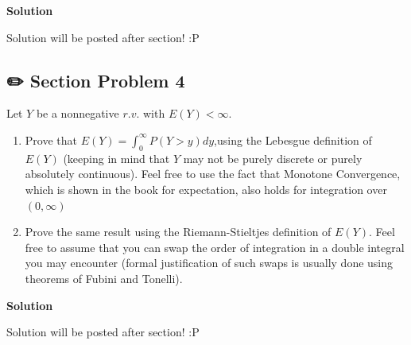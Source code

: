 \documentclass[
  letterpaper,
  DIV=11,
  numbers=noendperiod]{scrreprt}
\theoremstyle{plain}
\theoremstyle{definition}
\theoremstyle{remark}
\begin{document}
\begin{tcolorbox}[enhanced jigsaw, arc=.35mm, colframe=quarto-callout-tip-color-frame, left=2mm, rightrule=.15mm, bottomrule=.15mm, colback=white, toprule=.15mm, opacityback=0, leftrule=.75mm, breakable]
\begin{minipage}[t]{5.5mm}
\textcolor{quarto-callout-tip-color}{\faLightbulb}
\end{minipage}%
\begin{minipage}[t]{\textwidth - 5.5mm}

\textbf{Solution}\vspace{2mm}

Solution will be posted after section! :P

\end{minipage}%
\end{tcolorbox}

\hypertarget{section-problem-4-4}{%
\subsection*{✏️ Section Problem 4}\label{section-problem-4-4}}

Let \(Y\) be a nonnegative \(r.v.\) with \(E(Y)< \infty\).

\begin{enumerate}
\def\labelenumi{(\alph{enumi})}
\item
  Prove that \(E(Y) =\int_0^\infty P(Y > y)dy\),using the Lebesgue
  definition of \(E(Y)\) (keeping in mind that \(Y\) may not be purely
  discrete or purely absolutely continuous). Feel free to use the fact
  that Monotone Convergence, which is shown in the book for expectation,
  also holds for integration over \((0,\infty)\)
\item
  Prove the same result using the Riemann-Stieltjes definition of
  \(E(Y)\). Feel free to assume that you can swap the order of
  integration in a double integral you may encounter (formal
  justification of such swaps is usually done using theorems of Fubini
  and Tonelli).
\end{enumerate}

\begin{tcolorbox}[enhanced jigsaw, arc=.35mm, colframe=quarto-callout-tip-color-frame, left=2mm, rightrule=.15mm, bottomrule=.15mm, colback=white, toprule=.15mm, opacityback=0, leftrule=.75mm, breakable]
\begin{minipage}[t]{5.5mm}
\textcolor{quarto-callout-tip-color}{\faLightbulb}
\end{minipage}%
\begin{minipage}[t]{\textwidth - 5.5mm}

\textbf{Solution}\vspace{2mm}

Solution will be posted after section! :P

\end{minipage}%
\end{tcolorbox}
\end{document}
